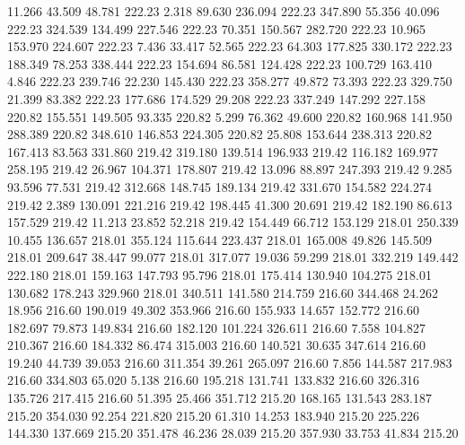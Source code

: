   11.266   43.509   48.781       222.23
   2.318   89.630  236.094       222.23
 347.890   55.356   40.096       222.23
 324.539  134.499  227.546       222.23
  70.351  150.567  282.720       222.23
  10.965  153.970  224.607       222.23
   7.436   33.417   52.565       222.23
  64.303  177.825  330.172       222.23
 188.349   78.253  338.444       222.23
 154.694   86.581  124.428       222.23
 100.729  163.410    4.846       222.23
 239.746   22.230  145.430       222.23
 358.277   49.872   73.393       222.23
 329.750   21.399   83.382       222.23
 177.686  174.529   29.208       222.23
 337.249  147.292  227.158       220.82
 155.551  149.505   93.335       220.82
   5.299   76.362   49.600       220.82
 160.968  141.950  288.389       220.82
 348.610  146.853  224.305       220.82
  25.808  153.644  238.313       220.82
 167.413   83.563  331.860       219.42
 319.180  139.514  196.933       219.42
 116.182  169.977  258.195       219.42
  26.967  104.371  178.807       219.42
  13.096   88.897  247.393       219.42
   9.285   93.596   77.531       219.42
 312.668  148.745  189.134       219.42
 331.670  154.582  224.274       219.42
   2.389  130.091  221.216       219.42
 198.445   41.300   20.691       219.42
 182.190   86.613  157.529       219.42
  11.213   23.852   52.218       219.42
 154.449   66.712  153.129       218.01
 250.339   10.455  136.657       218.01
 355.124  115.644  223.437       218.01
 165.008   49.826  145.509       218.01
 209.647   38.447   99.077       218.01
 317.077   19.036   59.299       218.01
 332.219  149.442  222.180       218.01
 159.163  147.793   95.796       218.01
 175.414  130.940  104.275       218.01
 130.682  178.243  329.960       218.01
 340.511  141.580  214.759       216.60
 344.468   24.262   18.956       216.60
 190.019   49.302  353.966       216.60
 155.933   14.657  152.772       216.60
 182.697   79.873  149.834       216.60
 182.120  101.224  326.611       216.60
   7.558  104.827  210.367       216.60
 184.332   86.474  315.003       216.60
 140.521   30.635  347.614       216.60
  19.240   44.739   39.053       216.60
 311.354   39.261  265.097       216.60
   7.856  144.587  217.983       216.60
 334.803   65.020    5.138       216.60
 195.218  131.741  133.832       216.60
 326.316  135.726  217.415       216.60
  51.395   25.466  351.712       215.20
 168.165  131.543  283.187       215.20
 354.030   92.254  221.820       215.20
  61.310   14.253  183.940       215.20
 225.226  144.330  137.669       215.20
 351.478   46.236   28.039       215.20
 357.930   33.753   41.834       215.20

